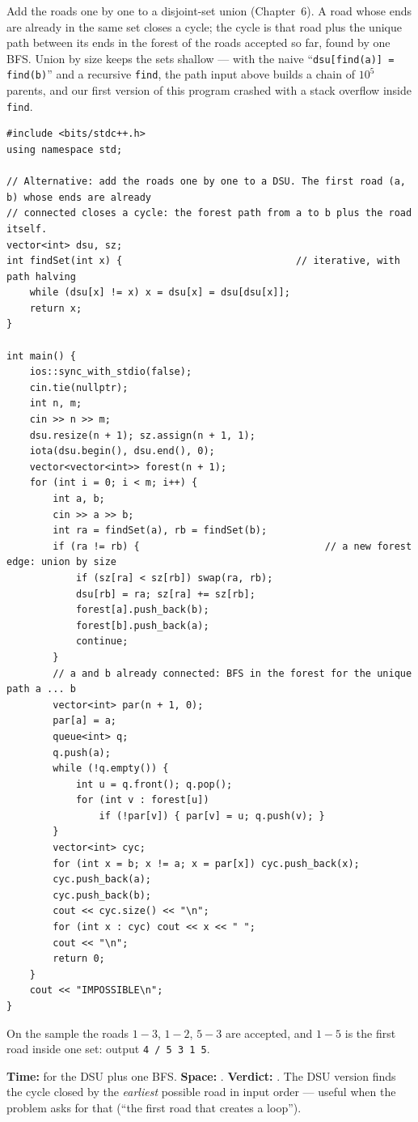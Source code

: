\begin{alternativebox}
Add the roads one by one to a disjoint-set union (Chapter~6). A road whose ends are already in the same set closes a cycle; the cycle is that road plus the unique path between its ends in the forest of the roads accepted so far, found by one BFS. Union by size keeps the sets shallow --- with the naive ``\texttt{dsu[find(a)] = find(b)}'' and a recursive \texttt{find}, the path input above builds a chain of $10^5$ parents, and our first version of this program crashed with a stack overflow inside \texttt{find}.

\begin{lstlisting}[style=cpp]
#include <bits/stdc++.h>
using namespace std;

// Alternative: add the roads one by one to a DSU. The first road (a, b) whose ends are already
// connected closes a cycle: the forest path from a to b plus the road itself.
vector<int> dsu, sz;
int findSet(int x) {                              // iterative, with path halving
    while (dsu[x] != x) x = dsu[x] = dsu[dsu[x]];
    return x;
}

int main() {
    ios::sync_with_stdio(false);
    cin.tie(nullptr);
    int n, m;
    cin >> n >> m;
    dsu.resize(n + 1); sz.assign(n + 1, 1);
    iota(dsu.begin(), dsu.end(), 0);
    vector<vector<int>> forest(n + 1);
    for (int i = 0; i < m; i++) {
        int a, b;
        cin >> a >> b;
        int ra = findSet(a), rb = findSet(b);
        if (ra != rb) {                                // a new forest edge: union by size
            if (sz[ra] < sz[rb]) swap(ra, rb);
            dsu[rb] = ra; sz[ra] += sz[rb];
            forest[a].push_back(b);
            forest[b].push_back(a);
            continue;
        }
        // a and b already connected: BFS in the forest for the unique path a ... b
        vector<int> par(n + 1, 0);
        par[a] = a;
        queue<int> q;
        q.push(a);
        while (!q.empty()) {
            int u = q.front(); q.pop();
            for (int v : forest[u])
                if (!par[v]) { par[v] = u; q.push(v); }
        }
        vector<int> cyc;
        for (int x = b; x != a; x = par[x]) cyc.push_back(x);
        cyc.push_back(a);
        cyc.push_back(b);
        cout << cyc.size() << "\n";
        for (int x : cyc) cout << x << " ";
        cout << "\n";
        return 0;
    }
    cout << "IMPOSSIBLE\n";
}
\end{lstlisting}
On the sample the roads $1{-}3$, $1{-}2$, $5{-}3$ are accepted, and $1{-}5$ is the first road inside one set: output \texttt{4 / 5 3 1 5}.
\begin{complexitybox}
\textbf{Time:}  for the DSU plus one  BFS. \textbf{Space:} . \textbf{Verdict:} \ac{}. The DSU version finds the cycle closed by the \emph{earliest} possible road in input order --- useful when the problem asks for that (``the first road that creates a loop'').
\end{complexitybox}
\end{alternativebox}

